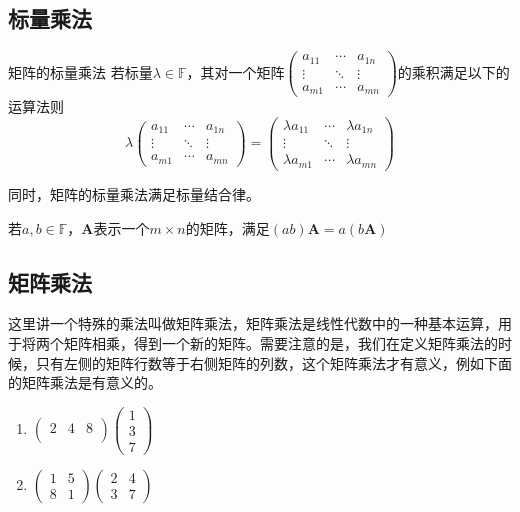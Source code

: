 \subsection{标量乘法}

\begin{definition}{矩阵的标量乘法}
	若标量$\lambda \in \mathbb{F}$，其对一个矩阵$\begin{pmatrix}  
		a_{11} & \cdots & a_{1n} \\  
		\vdots & \ddots & \vdots \\  
		a_{m1} & \cdots & a_{mn}  
	  \end{pmatrix} $的乘积满足以下的运算法则$$\lambda\begin{pmatrix}  
		a_{11} & \cdots & a_{1n} \\  
		\vdots & \ddots & \vdots \\  
		a_{m1} & \cdots & a_{mn}  
	  \end{pmatrix} =\begin{pmatrix}  
		\lambda a_{11} & \cdots & \lambda a_{1n} \\  
		\vdots & \ddots & \vdots \\  
		\lambda a_{m1} & \cdots & \lambda a_{mn}  
	  \end{pmatrix} $$
\end{definition}

同时，矩阵的标量乘法满足标量结合律。

\begin{corollary}
	若$a,b \in \mathbb{F}$，$\mathbf{A}$表示一个$m\times n$的矩阵，满足$(ab)\mathbf{A}=a(b\mathbf{A})$
\end{corollary}

\subsection{矩阵乘法}

这里讲一个特殊的乘法叫做矩阵乘法，矩阵乘法是线性代数中的一种基本运算，用于将两个矩阵相乘，得到一个新的矩阵。需要注意的是，我们在定义矩阵乘法的时候，只有左侧的矩阵行数等于右侧矩阵的列数，这个矩阵乘法才有意义，例如下面的矩阵乘法是有意义的。
\begin{enumerate}
	\item $\begin{pmatrix}  
		2 & 4 & 8\\    
	  \end{pmatrix} \begin{pmatrix}  
		1  \\  
		3  \\
		7
	  \end{pmatrix} $
	\item $\begin{pmatrix}  
		1 & 5 \\  
		8 & 1  
	  \end{pmatrix} \begin{pmatrix}  
		2 & 4 \\  
		3 & 7  
	  \end{pmatrix} $
\end{enumerate}

